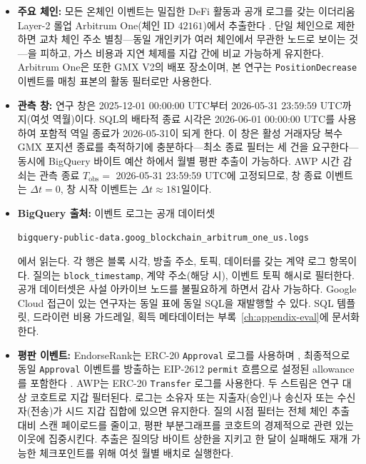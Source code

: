 \begin{itemize}
\item \textbf{주요 체인:} 모든 온체인 이벤트는 밀집한 DeFi 활동과 공개 로그를 갖는 이더리움 Layer-2 롤업 Arbitrum One(체인 ID $42161$)에서 추출한다 . 단일 체인으로 제한하면 교차 체인 주소 별칭---동일 개인키가 여러 체인에서 무관한 노드로 보이는 것---을 피하고, 가스 비용과 지연 체제를 지갑 간에 비교 가능하게 유지한다. Arbitrum One은 또한 GMX V2의 배포 장소이며, 본 연구는 \texttt{PositionDecrease} 이벤트를 매칭 표본의 활동 필터로만 사용한다.

\item \textbf{관측 창:} 연구 창은 2025-12-01 00:00:00 UTC부터 2026-05-31 23:59:59 UTC까지(여섯 역월)이다. SQL의 배타적 종료 시각은 2026-06-01 00:00:00 UTC를 사용하여 포함적 역일 종료가 2026-05-31이 되게 한다. 이 창은 활성 거래자당 복수 GMX 포지션 종료를 축적하기에 충분하다---최소 종료 필터는 세 건을 요구한다---동시에 BigQuery 바이트 예산 하에서 월별 평판 추출이 가능하다. AWP 시간 감쇠는 관측 종료 $T_{\mathrm{obs}}=$ 2026-05-31 23:59:59 UTC에 고정되므로, 창 종료 이벤트는 $\Delta t=0$, 창 시작 이벤트는 $\Delta t\approx 181$일이다.

\item \textbf{BigQuery 출처:} 이벤트 로그는 공개 데이터셋
\begin{center}
\texttt{bigquery-public-data.goog\_blockchain\_arbitrum\_one\_us.logs}
\end{center}
에서 읽는다. 각 행은 블록 시각, 방출 주소, 토픽, 데이터를 갖는 계약 로그 항목이다. 질의는 \texttt{block\_timestamp}, 계약 주소(해당 시), 이벤트 토픽 해시로 필터한다. 공개 데이터셋은 사설 아카이브 노드를 불필요하게 하면서 감사 가능하다. Google Cloud 접근이 있는 연구자는 동일 표에 동일 SQL을 재발행할 수 있다. SQL 템플릿, 드라이런 비용 가드레일, 획득 메타데이터는 부록~\ref{ch:appendix-eval}에 문서화한다.

\item \textbf{평판 이벤트:} EndorseRank는 ERC-20 \texttt{Approval} 로그를 사용하며 , 최종적으로 동일 \texttt{Approval} 이벤트를 방출하는 EIP-2612 \texttt{permit} 흐름으로 설정된 allowance를 포함한다 . AWP는 ERC-20 \texttt{Transfer} 로그를 사용한다. 두 스트림은 연구 대상 코호트로 지갑 필터된다. 로그는 소유자 또는 지출자(승인)나 송신자 또는 수신자(전송)가 시드 지갑 집합에 있으면 유지한다. 질의 시점 필터는 전체 체인 추출 대비 스캔 페이로드를 줄이고, 평판 부분그래프를 코호트의 경제적으로 관련 있는 이웃에 집중시킨다. 추출은 질의당 바이트 상한을 지키고 한 달이 실패해도 재개 가능한 체크포인트를 위해 여섯 월별 배치로 실행한다.


\end{itemize}

